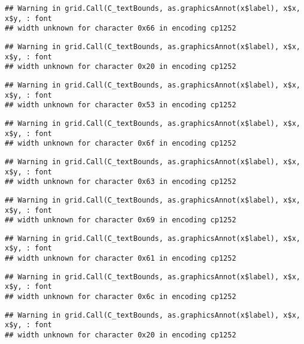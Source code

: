 \documentclass[
]{article}
\begin{document}
\begin{verbatim}
## Warning in grid.Call(C_textBounds, as.graphicsAnnot(x$label), x$x, x$y, : font
## width unknown for character 0x66 in encoding cp1252
\end{verbatim}

\begin{verbatim}
## Warning in grid.Call(C_textBounds, as.graphicsAnnot(x$label), x$x, x$y, : font
## width unknown for character 0x20 in encoding cp1252
\end{verbatim}

\begin{verbatim}
## Warning in grid.Call(C_textBounds, as.graphicsAnnot(x$label), x$x, x$y, : font
## width unknown for character 0x53 in encoding cp1252
\end{verbatim}

\begin{verbatim}
## Warning in grid.Call(C_textBounds, as.graphicsAnnot(x$label), x$x, x$y, : font
## width unknown for character 0x6f in encoding cp1252
\end{verbatim}

\begin{verbatim}
## Warning in grid.Call(C_textBounds, as.graphicsAnnot(x$label), x$x, x$y, : font
## width unknown for character 0x63 in encoding cp1252
\end{verbatim}

\begin{verbatim}
## Warning in grid.Call(C_textBounds, as.graphicsAnnot(x$label), x$x, x$y, : font
## width unknown for character 0x69 in encoding cp1252
\end{verbatim}

\begin{verbatim}
## Warning in grid.Call(C_textBounds, as.graphicsAnnot(x$label), x$x, x$y, : font
## width unknown for character 0x61 in encoding cp1252
\end{verbatim}

\begin{verbatim}
## Warning in grid.Call(C_textBounds, as.graphicsAnnot(x$label), x$x, x$y, : font
## width unknown for character 0x6c in encoding cp1252
\end{verbatim}

\begin{verbatim}
## Warning in grid.Call(C_textBounds, as.graphicsAnnot(x$label), x$x, x$y, : font
## width unknown for character 0x20 in encoding cp1252
\end{verbatim}
\end{document}
